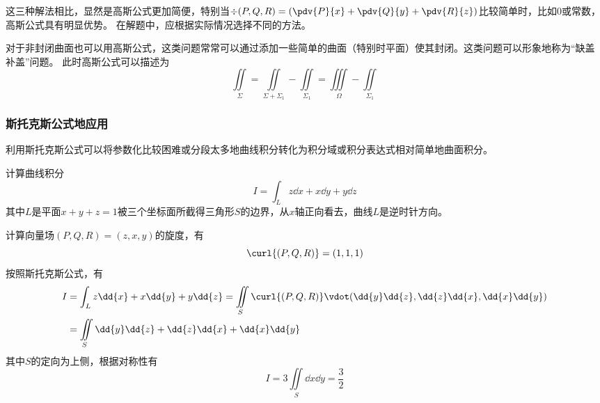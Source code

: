 这三种解法相比，显然是高斯公式更加简便，特别当$\div{(P,Q,R)} = \left(\pdv{P}{x}+\pdv{Q}{y}+\pdv{R}{z}\right)$比较简单时，比如$0$或常数，高斯公式具有明显优势。
在解题中，应根据实际情况选择不同的方法。

对于非封闭曲面也可以用高斯公式，这类问题常常可以通过添加一些简单的曲面（特别时平面）使其封闭。这类问题可以形象地称为“缺盖补盖”问题。
此时高斯公式可以描述为
\[ \iint\limits_\Sigma = \iint\limits_{\Sigma+\Sigma_1} - \iint\limits_{\Sigma_1} = \iiint\limits_\Omega - \iint\limits_{\Sigma_1} \]

\subsubsection{斯托克斯公式地应用}
利用斯托克斯公式可以将参数化比较困难或分段太多地曲线积分转化为积分域或积分表达式相对简单地曲面积分。

\begin{example}
    计算曲线积分
    \[ I = \int_L z\dd{x} + x\dd{y} + y\dd{z} \]
    其中$L$是平面$x+y+z=1$被三个坐标面所截得三角形$S$的边界，从$x$轴正向看去，曲线$L$是逆时针方向。
\end{example}
\begin{solution}
    计算向量场$(P,Q,R)=(z,x,y)$的旋度，有
    \[ \curl{(P,Q,R)} = (1,1,1) \]
    按照斯托克斯公式，有
    \begin{align*}
        I & = \int_L z\dd{x} + x\dd{y} + y\dd{z}
        = \iint\limits_S \curl{(P,Q,R)}\vdot(\dd{y}\dd{z},\dd{z}\dd{x},\dd{x}\dd{y}) \\
          & = \iint\limits_S \dd{y}\dd{z} + \dd{z}\dd{x} + \dd{x}\dd{y}              \\
    \end{align*}
    其中$S$的定向为上侧，根据对称性有
    \[ I = 3\iint\limits_S \dd{x}\dd{y} = \frac{3}{2} \]
\end{solution}

